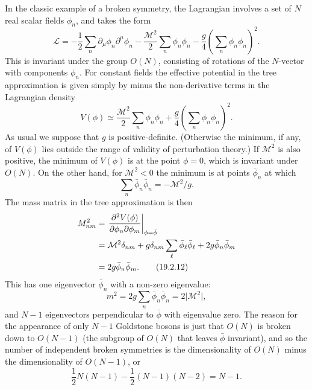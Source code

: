 In the classic example of a broken symmetry, the Lagrangian involves a set
of $N$ real scalar fields $\phi_n$, and takes the form
\begin{equation}
 \mathcal L=-\frac{1}{2}\sum_n
 \partial_\mu\phi_n\partial^\mu\phi_n
 -\frac{\mathcal M^2}{2}\sum_n\phi_n\phi_n
 -\frac{g}{4}\left(\sum_n\phi_n\phi_n\right)^2.
 \tag{19.2.9}\label{eq:19.2.9}
\end{equation}
This is invariant under the group $O(N)$, consisting of rotations of the
$N$-vector with components $\phi_n$. For constant fields the effective
potential in the tree approximation is given simply by minus the
non-derivative terms in the Lagrangian density
\begin{equation}
 V(\phi)\simeq\frac{\mathcal M^2}{2}\sum_n\phi_n\phi_n
 +\frac{g}{4}\left(\sum_n\phi_n\phi_n\right)^2.
 \tag{19.2.10}\label{eq:19.2.10}
\end{equation}
As usual we suppose that $g$ is positive-definite. (Otherwise the minimum,
if any, of $V(\phi)$ lies outside the range of validity of perturbation
theory.) If $\mathcal M^2$ is also positive, the minimum of $V(\phi)$ is at
the point $\phi=0$, which is invariant under $O(N)$. On the other hand, for
$\mathcal M^2<0$ the minimum is at points $\bar\phi_n$ at which
\begin{equation}
 \sum_n\bar\phi_n\bar\phi_n=-\mathcal M^2/g.
 \tag{19.2.11}\label{eq:19.2.11}
\end{equation}
The mass matrix in the tree approximation is then
\begin{align}
 M^2_{nm}
 &=
 \left.\frac{\partial^2V(\phi)}
 {\partial\phi_n\partial\phi_m}\right|_{\phi=\bar\phi}
 \notag\\
 &=\mathcal M^2\delta_{nm}
 +g\delta_{nm}\sum_\ell\bar\phi_\ell\bar\phi_\ell
 +2g\bar\phi_n\bar\phi_m
 \notag\\
 &=2g\bar\phi_n\bar\phi_m.
 \tag{19.2.12}\label{eq:19.2.12}
\end{align}
This has one eigenvector $\bar\phi_n$ with a non-zero eigenvalue:
\begin{equation}
 m^2=2g\sum_n\bar\phi_n\bar\phi_n=2\lvert\mathcal M^2\rvert,
 \tag{19.2.13}\label{eq:19.2.13}
\end{equation}
and $N-1$ eigenvectors perpendicular to $\bar\phi$ with eigenvalue zero. The
reason for the appearance of only $N-1$ Goldstone bosons is just that $O(N)$
is broken down to $O(N-1)$ (the subgroup of $O(N)$ that leaves $\bar\phi$
invariant), and so the number of independent broken symmetries is the
dimensionality of $O(N)$ minus the dimensionality of $O(N-1)$, or
\begin{equation}
 \frac{1}{2}N(N-1)-\frac{1}{2}(N-1)(N-2)=N-1.
 \tag{19.2.14}\label{eq:19.2.14}
\end{equation}

